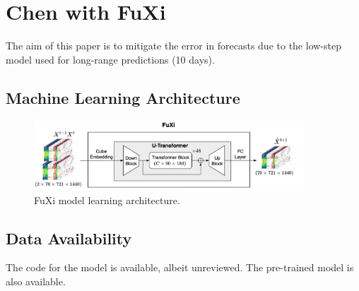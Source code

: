 \section{Chen with FuXi}

The aim of this paper is to mitigate the error in forecasts due to the low-step model used for long-range predictions (10 days).

\subsection{Machine Learning Architecture}

\begin{figure}[ht]
\centering
\includegraphics[width=0.9\textwidth]{media/FuXi_archi.png}
\caption{FuXi model learning architecture.}
\label{fig}
\end{figure}


\subsection{Data Availability}

The code for the model is available, albeit unreviewed. The pre-trained model is also available.